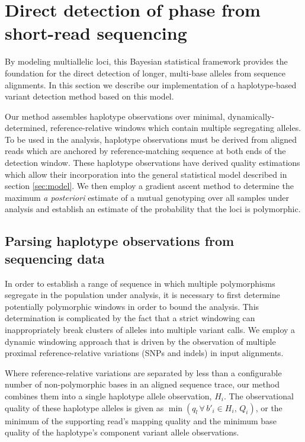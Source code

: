 \documentclass{article}
\begin{document}

\section{Direct detection of phase from short-read sequencing}

By modeling multiallelic loci, this Bayesian statistical framework provides the foundation for the direct detection of longer, multi-base alleles from sequence alignments.  In this section we describe our implementation of a haplotype-based variant detection method based on this model.

Our method assembles haplotype observations over minimal, dynamically-determined, reference-relative windows which contain multiple segregating alleles.  To be used in the analysis, haplotype observations must be derived from aligned reads which are anchored by reference-matching sequence at both ends of the detection window.  These haplotype observations have derived quality estimations which allow their incorporation into the general statistical model described in section \ref{sec:model}.  We then employ a gradient ascent method to determine the maximum \emph{a posteriori} estimate of a mutual genotyping over all samples under analysis and establish an estimate of the probability that the loci is polymorphic.

\subsection{Parsing haplotype observations from sequencing data}
\label{sec:parsing}

In order to establish a range of sequence in which multiple polymorphisms segregate in the population under analysis, it is necessary to first determine potentially polymorphic windows in order to bound the analysis.  This determination is complicated by the fact that a strict windowing can inappropriately break clusters of alleles into multiple variant calls.  We employ a dynamic windowing approach that is driven by the observation of multiple proximal reference-relative variations (SNPs and indels) in input alignments.

Where reference-relative variations are separated by less than a configurable number of non-polymorphic bases in an aligned sequence trace, our method combines them into a single haplotype allele observation, $H_i$.  The observational quality of these haplotype alleles is given as $\min ( q_l \, \forall \, b'_i \in H_i , \, Q_i)$, or the minimum of the supporting read's mapping quality and the minimum base quality of the haplotype's component variant allele observations.
\end{document}
